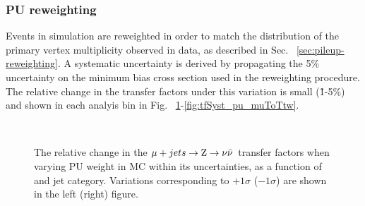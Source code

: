 \subsubsection*{PU reweighting}
\label{sec:tfSyst_pu}

Events in simulation are reweighted in order to match the distribution 
of the primary vertex multiplicity observed in data, as described in Sec. ~\ref{sec:pileup-reweighting}.
A systematic uncertainty is derived by propagating 
the 5\% uncertainty on the minimum bias cross section used in the reweighting procedure. 
The relative change in the transfer factors under this variation is
small (\~1-5\%)
and shown in each analyis bin in Fig. ~\ref{fig:tfSyst_pu_muToZinv}-\ref{fig:tfSyst_pu_muToTtw}.

\begin{figure}[]
  \centering
   ~~
  \\

  \caption{\label{fig:tfSyst_pu_muToZinv} The relative change in the $\mj \rightarrow \znunu$ transfer
  factors when varying PU weight in MC within its uncertainties, as a function of \scalht and jet category. 
  Variations corresponding to $+1\sigma$ ($-1\sigma$) are shown in the left (right) figure. 
  }
\end{figure}


